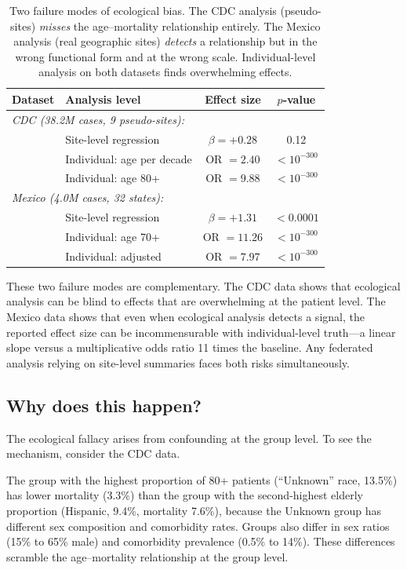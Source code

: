 \documentclass{article}
\begin{document}
\begin{table}[t]
\centering
\caption{Two failure modes of ecological bias.  The CDC analysis (pseudo-sites)
\emph{misses} the age--mortality relationship entirely.  The Mexico analysis
(real geographic sites) \emph{detects} a relationship but in the wrong
functional form and at the wrong scale.  Individual-level analysis on both
datasets finds overwhelming effects.}
\label{tab:ecological}
\begin{tabular}{llcc}
\toprule
Dataset & Analysis level & Effect size & $p$-value \\
\midrule
\multicolumn{4}{l}{\emph{CDC (38.2M cases, 9 pseudo-sites):}} \\
& Site-level regression & $\beta = +0.28$ & 0.12 \\
& Individual: age per decade & OR $= 2.40$ & $< 10^{-300}$ \\
& Individual: age 80+ & OR $= 9.88$ & $< 10^{-300}$ \\
\midrule
\multicolumn{4}{l}{\emph{Mexico (4.0M cases, 32 states):}} \\
& Site-level regression & $\beta = +1.31$ & $< 0.0001$ \\
& Individual: age 70+ & OR $= 11.26$ & $< 10^{-300}$ \\
& Individual: adjusted & OR $= 7.97$ & $< 10^{-300}$ \\
\bottomrule
\end{tabular}
\end{table}

These two failure modes are complementary.  The CDC data shows that
ecological analysis can be blind to effects that are overwhelming at the
patient level.  The Mexico data shows that even when ecological analysis
detects a signal, the reported effect size can be incommensurable with
individual-level truth---a linear slope versus a multiplicative odds ratio
11 times the baseline.  Any federated analysis relying on site-level
summaries faces both risks simultaneously.


\subsection{Why does this happen?}

The ecological fallacy arises from confounding at the group level.  To see
the mechanism, consider the CDC data.

The group with the highest proportion of 80+ patients (``Unknown'' race,
13.5\%) has lower mortality (3.3\%) than the group with the second-highest
elderly proportion (Hispanic, 9.4\%, mortality 7.6\%), because the Unknown
group has different sex composition and comorbidity rates.  Groups also
differ in sex ratios (15\% to 65\% male) and comorbidity prevalence (0.5\%
to 14\%).  These differences scramble the age--mortality relationship at the
group level.
\end{document}
